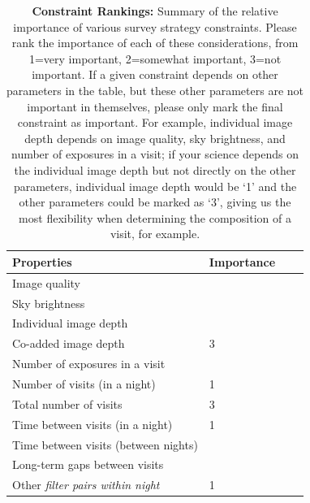 \documentclass[11pt]{article}
\begin{document}
\begin{table}[ht]
    \centering
    \begin{tabular}{l|l|l|l}
        \toprule
        Properties & Importance \hspace{.3in} \\
        \midrule
        Image quality &     \\
        Sky brightness &  \\
        Individual image depth &   \\
        Co-added image depth &   3\\
        Number of exposures in a visit   &   \\
        Number of visits (in a night)  &  1 \\ 
        Total number of visits &   3\\
        Time between visits (in a night) & 1 \\
        Time between visits (between nights)  &   \\
        Long-term gaps between visits & \\
        Other \emph{filter pairs within night} & 1 \\
        \bottomrule
    \end{tabular}
    \caption{{\bf Constraint Rankings:} Summary of the relative importance of various survey strategy constraints. Please rank the importance of each of these considerations, from 1=very important, 2=somewhat important, 3=not important. If a given constraint depends on other parameters in the table, but these other parameters are not important in themselves, please only mark the final constraint as important. For example, individual image depth depends on image quality, sky brightness, and number of exposures in a visit; if your science depends on the individual image depth but not directly on the other parameters, individual image depth would be `1' and the other parameters could be marked as `3', giving us the most flexibility when determining the composition of a visit, for example.}
        \label{tab:obs_constraints}
\end{table}
\end{document}
